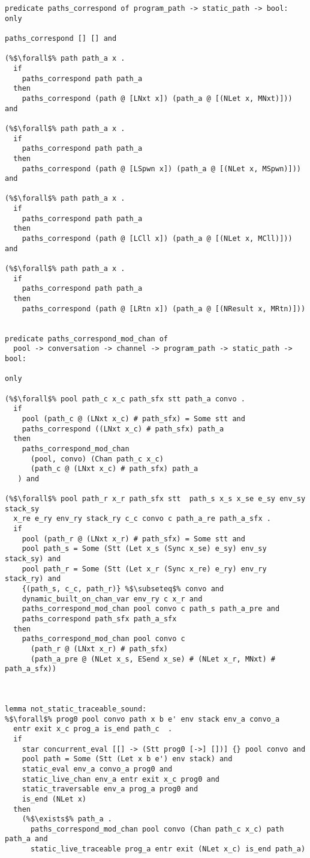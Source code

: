 \documentclass{article}
\begin{document}
\begin{lstlisting}[language=logic, escapechar=\%]
predicate paths_correspond of program_path -> static_path -> bool:
only

paths_correspond [] [] and

(%$\forall$% path path_a x .
  if
    paths_correspond path path_a
  then
    paths_correspond (path @ [LNxt x]) (path_a @ [(NLet x, MNxt)])) and

(%$\forall$% path path_a x .
  if
    paths_correspond path path_a
  then
    paths_correspond (path @ [LSpwn x]) (path_a @ [(NLet x, MSpwn)])) and

(%$\forall$% path path_a x .
  if
    paths_correspond path path_a
  then
    paths_correspond (path @ [LCll x]) (path_a @ [(NLet x, MCll)])) and

(%$\forall$% path path_a x .
  if
    paths_correspond path path_a
  then
    paths_correspond (path @ [LRtn x]) (path_a @ [(NResult x, MRtn)]))


predicate paths_correspond_mod_chan of 
  pool -> conversation -> channel -> program_path -> static_path -> bool:

only

(%$\forall$% pool path_c x_c path_sfx stt path_a convo .
  if
    pool (path_c @ (LNxt x_c) # path_sfx) = Some stt and
    paths_correspond ((LNxt x_c) # path_sfx) path_a
  then
    paths_correspond_mod_chan
      (pool, convo) (Chan path_c x_c)
      (path_c @ (LNxt x_c) # path_sfx) path_a
   ) and

(%$\forall$% pool path_r x_r path_sfx stt  path_s x_s x_se e_sy env_sy stack_sy
  x_re e_ry env_ry stack_ry c_c convo c path_a_re path_a_sfx . 
  if
    pool (path_r @ (LNxt x_r) # path_sfx) = Some stt and 
    pool path_s = Some (Stt (Let x_s (Sync x_se) e_sy) env_sy stack_sy) and
    pool path_r = Some (Stt (Let x_r (Sync x_re) e_ry) env_ry stack_ry) and
    {(path_s, c_c, path_r)} %$\subseteq$% convo and 
    dynamic_built_on_chan_var env_ry c x_r and 
    paths_correspond_mod_chan pool convo c path_s path_a_pre and
    paths_correspond path_sfx path_a_sfx
  then
    paths_correspond_mod_chan pool convo c
      (path_r @ (LNxt x_r) # path_sfx)
      (path_a_pre @ (NLet x_s, ESend x_se) # (NLet x_r, MNxt) # path_a_sfx))



lemma not_static_traceable_sound: 
%$\forall$% prog0 pool convo path x b e' env stack env_a convo_a
  entr exit x_c prog_a is_end path_c  . 
  if
    star concurrent_eval [[] -> (Stt prog0 [->] [])] {} pool convo and
    pool path = Some (Stt (Let x b e') env stack) and
    static_eval env_a convo_a prog0 and
    static_live_chan env_a entr exit x_c prog0 and
    static_traversable env_a prog_a prog0 and 
    is_end (NLet x)
  then
    (%$\exists$% path_a . 
      paths_correspond_mod_chan pool convo (Chan path_c x_c) path path_a and 
      static_live_traceable prog_a entr exit (NLet x_c) is_end path_a)



\end{lstlisting}
\end{document}
